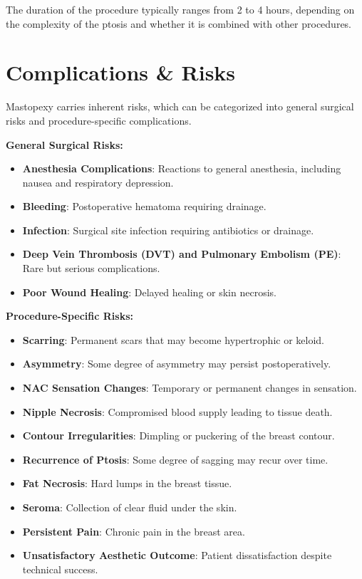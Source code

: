 The duration of the procedure typically ranges from 2 to 4 hours, depending on the complexity of the ptosis and whether it is combined with other procedures.

\section*{Complications \& Risks}
Mastopexy carries inherent risks, which can be categorized into general surgical risks and procedure-specific complications.

\textbf{General Surgical Risks:}
\begin{itemize}
  \item \textbf{Anesthesia Complications}: Reactions to general anesthesia, including nausea and respiratory depression.
  
  \item \textbf{Bleeding}: Postoperative hematoma requiring drainage.
  
  \item \textbf{Infection}: Surgical site infection requiring antibiotics or drainage.
  
  \item \textbf{Deep Vein Thrombosis (DVT) and Pulmonary Embolism (PE)}: Rare but serious complications.
  
  \item \textbf{Poor Wound Healing}: Delayed healing or skin necrosis.
\end{itemize}

\textbf{Procedure-Specific Risks:}
\begin{itemize}
  \item \textbf{Scarring}: Permanent scars that may become hypertrophic or keloid.
  
  \item \textbf{Asymmetry}: Some degree of asymmetry may persist postoperatively.
  
  \item \textbf{NAC Sensation Changes}: Temporary or permanent changes in sensation.
  
  \item \textbf{Nipple Necrosis}: Compromised blood supply leading to tissue death.
  
  \item \textbf{Contour Irregularities}: Dimpling or puckering of the breast contour.
  
  \item \textbf{Recurrence of Ptosis}: Some degree of sagging may recur over time.
  
  \item \textbf{Fat Necrosis}: Hard lumps in the breast tissue.
  
  \item \textbf{Seroma}: Collection of clear fluid under the skin.
  
  \item \textbf{Persistent Pain}: Chronic pain in the breast area.
  
  \item \textbf{Unsatisfactory Aesthetic Outcome}: Patient dissatisfaction despite technical success.
\end{itemize}


